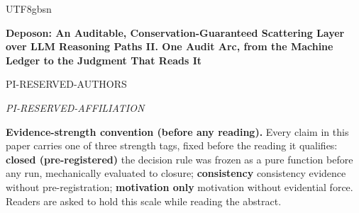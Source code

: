 \documentclass[11pt,letterpaper]{article}
\begin{document}
\begin{CJK}{UTF8}{gbsn}
\begin{center}
{\LARGE\bfseries Deposon: An Auditable, Conservation-Guaranteed Scattering Layer over LLM Reasoning Paths \textemdash{} II. One Audit Arc, from the Machine Ledger to the Judgment That Reads It\par}
\end{center}
\vspace{0.8em}
\begin{center}
{\normalsize PI-RESERVED-AUTHORS\par}
\vspace{0.2em}
{\small\itshape PI-RESERVED-AFFILIATION\par}
\end{center}
\vspace{0.8em}
\textbf{Evidence-strength convention (before any reading).} Every claim in this paper carries one of three strength tags, fixed before the reading it qualifies: \textbf{closed (pre-registered)} \textemdash{} the decision rule was frozen as a pure function before any run, mechanically evaluated to closure; \textbf{consistency} \textemdash{} consistency evidence without pre-registration; \textbf{motivation only} \textemdash{} motivation without evidential force. Readers are asked to hold this scale while reading the abstract.


\end{CJK}
\end{document}
